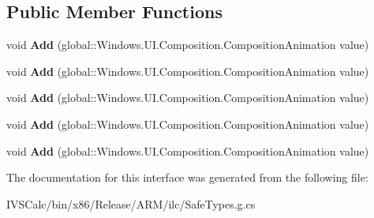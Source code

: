 \subsection*{Public Member Functions}
\begin{DoxyCompactItemize}
\item 
\mbox{\label{interface_windows_1_1_u_i_1_1_composition_1_1_i_composition_animation_group_a2a9bb2126e7b6c4341ab6e1cf774e0b6}} 
void {\bfseries Add} (global\+::\+Windows.\+U\+I.\+Composition.\+Composition\+Animation value)
\item 
\mbox{\label{interface_windows_1_1_u_i_1_1_composition_1_1_i_composition_animation_group_a2a9bb2126e7b6c4341ab6e1cf774e0b6}} 
void {\bfseries Add} (global\+::\+Windows.\+U\+I.\+Composition.\+Composition\+Animation value)
\item 
\mbox{\label{interface_windows_1_1_u_i_1_1_composition_1_1_i_composition_animation_group_a2a9bb2126e7b6c4341ab6e1cf774e0b6}} 
void {\bfseries Add} (global\+::\+Windows.\+U\+I.\+Composition.\+Composition\+Animation value)
\item 
\mbox{\label{interface_windows_1_1_u_i_1_1_composition_1_1_i_composition_animation_group_a2a9bb2126e7b6c4341ab6e1cf774e0b6}} 
void {\bfseries Add} (global\+::\+Windows.\+U\+I.\+Composition.\+Composition\+Animation value)
\item 
\mbox{\label{interface_windows_1_1_u_i_1_1_composition_1_1_i_composition_animation_group_a2a9bb2126e7b6c4341ab6e1cf774e0b6}} 
void {\bfseries Add} (global\+::\+Windows.\+U\+I.\+Composition.\+Composition\+Animation value)
\end{DoxyCompactItemize}


The documentation for this interface was generated from the following file\+:\begin{DoxyCompactItemize}
\item 
I\+V\+S\+Calc/bin/x86/\+Release/\+A\+R\+M/ilc/Safe\+Types.\+g.\+cs\end{DoxyCompactItemize}
